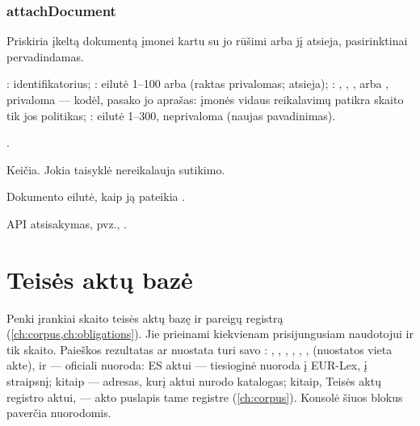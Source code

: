 \subsubsection{attachDocument}\label{sec:tools:attachDocument}
\begin{description}[style=multiline, leftmargin=19mm, labelwidth=17mm, labelsep=2mm,
  font=\sffamily\bfseries\footnotesize\color{ink}, itemsep=1pt, topsep=2pt, before=\raggedright]
  \item[Paskirtis] Priskiria įkeltą dokumentą įmonei kartu su jo rūšimi arba jį atsieja,
    pasirinktinai pervadindamas.
  \item[Įvestis] : identifikatorius; : eilutė 1--100 arba
     (raktas privalomas;  atsieja); : ,
    , ,  arba , privaloma --- kodėl,
    pasako jo aprašas: įmonės vidaus reikalavimų patikra skaito tik jos politikas;
    : eilutė 1--300, neprivaloma (naujas pavadinimas).
  \item[Užklausos] .
  \item[Pobūdis] Keičia. Jokia taisyklė nereikalauja sutikimo.
  \item[Grąžina] Dokumento eilutė, kaip ją pateikia .
  \item[Klaidos] API atsisakymas, pvz., .
\end{description}


\section{Teisės aktų bazė}\label{sec:tools:corpus}

Penki įrankiai skaito teisės aktų bazę ir pareigų registrą (\cref{ch:corpus,ch:obligations}).
Jie prieinami kiekvienam prisijungusiam naudotojui ir tik skaito. Paieškos rezultatas ar
nuostata turi savo : , , ,
, , ,  (nuostatos vieta akte),
 ir  --- oficiali nuoroda: ES aktui --- tiesioginė nuoroda į
EUR-Lex, į straipsnį; kitaip --- adresas, kurį aktui nurodo katalogas; kitaip, Teisės aktų
registro aktui, --- akto puslapis tame registre (\cref{ch:corpus}). Konsolė šiuos blokus paverčia
nuorodomis.

